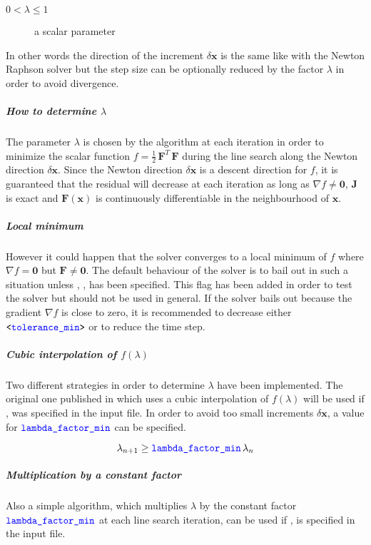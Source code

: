 \begin{description}
\item[$0 < \lambda \le 1$] a scalar parameter
\end{description}

In other words the direction of the increment $\delta\boldsymbol{x}$ is the same like with the Newton Raphson solver but the step size can be optionally reduced by the factor $\lambda$ in order to avoid divergence.

\subparagraph{How to determine $\lambda$}
The parameter $\lambda$ is chosen by the algorithm at each iteration in order to minimize the scalar function $f=\frac{1}{2}\,\boldsymbol{F}^T\,\boldsymbol{F}$ during the line search along the Newton direction $\delta\boldsymbol{x}$. Since the Newton direction $\delta\boldsymbol{x}$ is a descent direction for $f$, it is guaranteed that the residual will decrease at each iteration as long as $\nabla f \neq \boldsymbol{0}$, $\boldsymbol{J}$ is exact and $\boldsymbol{F}\left(\boldsymbol{x}\right)$ is continuously differentiable in the neighbourhood of $\boldsymbol{x}$.

\subparagraph{Local minimum}
However it could happen that the solver converges to a local minimum of $f$ where $\nabla f = \boldsymbol{0}$ but $\boldsymbol{F} \neq \boldsymbol{0}$.
The default behaviour of the solver is to bail out in such a situation unless , ,  has been specified. This flag has been added in order to test the solver but should not be used in general. If the solver bails out because the gradient $\nabla f$ is close to zero, it is recommended to decrease either $\texttt{<\textcolor{blue}{tolerance\_min}>}$ or to reduce the time step.

\subparagraph{Cubic interpolation of $f\left(\lambda\right)$}
Two different strategies in order to determine $\lambda$ have been implemented.
The original one published in \cite{NUMERICAL-RECIPES-IN-C} which uses a cubic interpolation of $f\left(\lambda\right)$ will be used if ,  was specified in the input file.
In order to avoid too small increments $\delta\boldsymbol{x}$, a value for $\textcolor{blue}{\texttt{lambda\_factor\_min}}$ can be specified.

\begin{equation}
\lambda_{n+1} \geq \textcolor{blue}{\texttt{lambda\_factor\_min}} \, \lambda_{n}
\end{equation}

\subparagraph{Multiplication by a constant factor}
Also a simple algorithm, which multiplies $\lambda$ by the constant factor $\textcolor{blue}{\texttt{lambda\_factor\_min}}$ at each line search iteration, can be used if ,  is specified in the input file.

